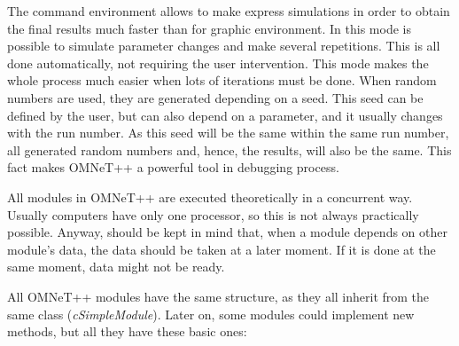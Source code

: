 The command environment allows to make express simulations in order to obtain the final results much faster than for graphic environment. In this 
mode is possible to simulate parameter changes and make several repetitions. This is all done automatically, not requiring the user intervention.
This mode makes the whole process much easier when lots of iterations must be done. When random numbers are used, they are generated depending on a seed. 
This seed can be defined by the user, but can also depend on a parameter, and it usually changes with the run number. As this seed will be the same within the
same run number, all generated random numbers and, hence, the results, will also be the same. This fact makes \ac{OMNeT++} a powerful tool in debugging 
process.

All modules in \ac{OMNeT++} are executed theoretically in a concurrent way. Usually computers have only one processor, so this is not always
practically possible. Anyway, should be kept in mind that, when a module depends on other module's data, the data should be taken at a 
later moment. If it is done at the same moment, data might not be ready.

All \ac{OMNeT++} modules have the same structure, as they all inherit from the same class (\textit{cSimpleModule}). Later on, some modules could 
implement new methods, but all they have these basic ones:

